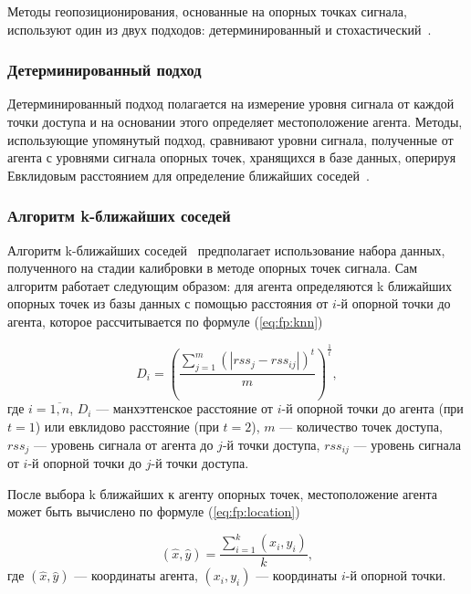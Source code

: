 Методы геопозиционирования, основанные на опорных точках сигнала, используют один из двух подходов: детерминированный и стохастический~\cite{intro}.

\subsubsection{Детерминированный подход}

Детерминированный подход полагается на измерение уровня сигнала от каждой точки доступа и на основании этого определяет местоположение агента. Методы, использующие упомянутый подход, сравнивают уровни сигнала, полученные от агента с уровнями сигнала опорных точек, хранящихся в базе данных, оперируя Евклидовым расстоянием для определение ближайших соседей~\cite{fingerprint}.

\subsubsection{Алгоритм k-ближайших соседей}

Алгоритм k-ближайших соседей~\cite{knn} предполагает использование набора данных, полученного на стадии калибровки в методе опорных точек сигнала. Сам алгоритм работает следующим образом: для агента определяются k ближайших опорных точек из базы данных с помощью расстояния от $i$-й опорной точки до агента, которое рассчитывается по формуле (\ref{eq:fp:knn})

\begin{equation}
    D_i = \left(
        \frac{\sum\limits_{j=1}^{m} (|rss_j - rss_{ij}|)^t}{m}
    \right)^{\frac{1}{t}},
    \label{eq:fp:knn}
\end{equation}
где $i = \overline{1, n}$, $D_i$ --- манхэттенское расстояние от $i$-й опорной точки до агента (при $t = 1$) или евклидово расстояние (при $t = 2$), $m$ --- количество точек доступа, $rss_j$ --- уровень сигнала от агента до $j$-й точки доступа, $rss_{ij}$ --- уровень сигнала от $i$-й опорной точки до $j$-й точки доступа.

После выбора k ближайших к агенту опорных точек, местоположение агента может быть вычислено по формуле (\ref{eq:fp:location})

\begin{equation}
    (\hat{x}, \hat{y}) = \frac{\sum\limits_{i=1}^{k}(x_i, y_i)}{k},
    \label{eq:fp:location}
\end{equation}
где $(\hat{x}, \hat{y})$ --- координаты агента, $(x_i, y_i)$ --- координаты $i$-й опорной точки.

